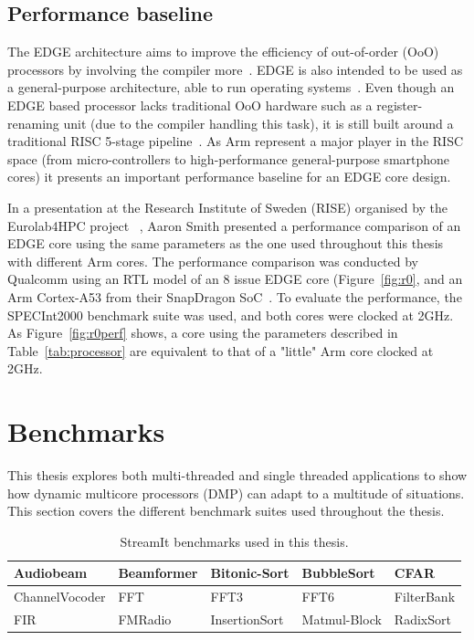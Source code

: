 \subsection{Performance baseline}
The EDGE architecture aims to improve the efficiency of out-of-order (OoO) processors by involving the compiler more~\cite{aarontalk, gray2018edge}.
EDGE is also intended to be used as a general-purpose architecture, able to run operating systems~\cite{aarontalk}.
Even though an EDGE based processor lacks traditional OoO hardware such as a register-renaming unit (due to the compiler handling this task), it is still built around a traditional RISC 5-stage pipeline~\cite{gray2018edge}.
As Arm represent a major player in the RISC space (from micro-controllers to high-performance general-purpose smartphone cores) it presents an important performance baseline for an EDGE core design.

In a presentation at the Research Institute of Sweden (RISE) organised by the Eurolab4HPC project~\cite{eurolab4hpc, aarontalk} , Aaron Smith presented a performance comparison of an EDGE core using the same parameters as the one used throughout this thesis with different Arm cores.
The performance comparison was conducted by Qualcomm using an RTL model of an 8 issue EDGE core (Figure~\ref{fig:r0}, and an Arm Cortex-A53 from their SnapDragon SoC~\cite{aarontalk}.
To evaluate the performance, the SPECInt2000 benchmark suite was used, and both cores were clocked at 2GHz.
As Figure~\ref{fig:r0perf} shows, a core using the parameters described in Table~\ref{tab:processor} are equivalent to that of a "little" Arm core clocked at 2GHz.

\section{Benchmarks}
This thesis explores both multi-threaded and single threaded applications to show how dynamic multicore processors (DMP) can adapt to a multitude of situations. 
This section covers the different benchmark suites used throughout the thesis.

\begin{table}[t]
\centering
  \smaller
 \begin{tabular} { | l | l | l | l | l | }
 \hline
  Audiobeam&   Beamformer&  Bitonic-Sort  &  BubbleSort & CFAR \\ \hline
  ChannelVocoder &  FFT& FFT3 & FFT6&  FilterBank \\ \hline
  FIR &  FMRadio &   InsertionSort &   Matmul-Block &  RadixSort\\ \hline
 \end{tabular}
  \caption{StreamIt benchmarks used in this thesis.}\label{tab:streamwl}
\end{table}

